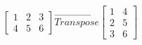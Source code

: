 \documentclass[preview]{standalone}
\begin{document}
\[ 
 \begin{bmatrix}1 & 2 & 3 \\ 4 & 5 & 6\end{bmatrix} 
    \overrightarrow{Transpose} 
 \begin{bmatrix}1 & 4 \\ 2 & 5 \\ 3 & 6\end{bmatrix} 
 \] 
\end{document}
